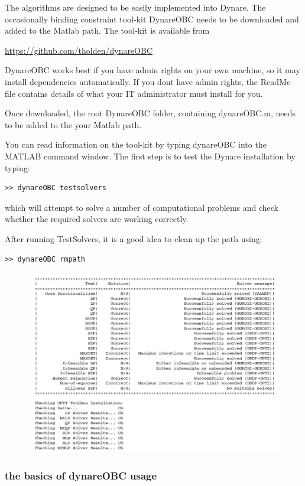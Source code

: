 \documentclass[cn,10pt,math=newtx,citestyle=gb7714-2015,bibstyle=gb7714-2015]{elegantbook}
\begin{document}
The algorithms are designed to be easily implemented into Dynare. The occasionally binding constraint tool-kit DynareOBC needs to be downloaded and added to the Matlab path. The tool-kit is available from

\url{https://github.com/tholden/dynareOBC}

DynareOBC works best if you have admin rights on your own machine, so it may install dependencies automatically. If you dont have admin rights, the ReadMe file contains details of what your IT administrator must install for you.

Once downloaded, the root DynareOBC folder, containing dynareOBC.m, needs to be added to the your Matlab path.

You can read information on the tool-kit by typing dynareOBC into the MATLAB command window. The first step is to test the Dynare installation by typing:

\begin{lstlisting}[frame=shadowbox]
	>> dynareOBC testsolvers
\end{lstlisting}

which will attempt to solve a number of computational problems and check whether the required solvers are working correctly.

After running TestSolvers, it is a good idea to clean up the path using:

\begin{lstlisting}[frame=shadowbox]
	>> dynareOBC rmpath
\end{lstlisting}

\begin{figure}[htbp!]
	\centering
	\includegraphics[width=0.8\linewidth]{FIG/rmpath}
	\centering
\end{figure}

\subsubsection{the basics of dynareOBC usage}
\end{document}
